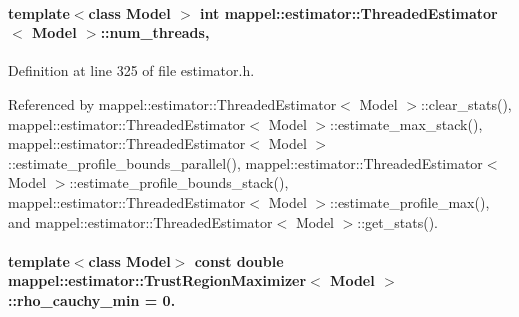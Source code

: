 \paragraph[{\texorpdfstring{num\+\_\+threads}{num_threads}}]{\setlength{\rightskip}{0pt plus 5cm}template$<$class Model $>$ int {\bf mappel\+::estimator\+::\+Threaded\+Estimator}$<$ Model $>$\+::num\+\_\+threads\hspace{0.3cm}{\ttfamily [protected]}, {\ttfamily [inherited]}}\hypertarget{classmappel_1_1estimator_1_1ThreadedEstimator_af746a83929a7217b4084d0e10f850bc3}{}\label{classmappel_1_1estimator_1_1ThreadedEstimator_af746a83929a7217b4084d0e10f850bc3}


Definition at line 325 of file estimator.\+h.



Referenced by mappel\+::estimator\+::\+Threaded\+Estimator$<$ Model $>$\+::clear\+\_\+stats(), mappel\+::estimator\+::\+Threaded\+Estimator$<$ Model $>$\+::estimate\+\_\+max\+\_\+stack(), mappel\+::estimator\+::\+Threaded\+Estimator$<$ Model $>$\+::estimate\+\_\+profile\+\_\+bounds\+\_\+parallel(), mappel\+::estimator\+::\+Threaded\+Estimator$<$ Model $>$\+::estimate\+\_\+profile\+\_\+bounds\+\_\+stack(), mappel\+::estimator\+::\+Threaded\+Estimator$<$ Model $>$\+::estimate\+\_\+profile\+\_\+max(), and mappel\+::estimator\+::\+Threaded\+Estimator$<$ Model $>$\+::get\+\_\+stats().

\paragraph[{\texorpdfstring{rho\+\_\+cauchy\+\_\+min}{rho_cauchy_min}}]{\setlength{\rightskip}{0pt plus 5cm}template$<$class Model$>$ const double {\bf mappel\+::estimator\+::\+Trust\+Region\+Maximizer}$<$ Model $>$\+::rho\+\_\+cauchy\+\_\+min = 0.\hspace{0.3cm}{\ttfamily [static]}}\hypertarget{classmappel_1_1estimator_1_1TrustRegionMaximizer_a72f2a3cf0c2c9a89f516fe4d64981660}{}\label{classmappel_1_1estimator_1_1TrustRegionMaximizer_a72f2a3cf0c2c9a89f516fe4d64981660}


